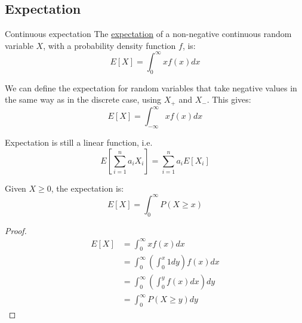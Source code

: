 \documentclass[../Main.tex]{subfiles}
\begin{document}
\subsection{Expectation}
\begin{definition}{Continuous expectation}
    The \underline{expectation} of a non-negative continuous random variable $X$, with a probability density function $f$, is:
    \begin{equation*}
        E[X] = \int_0^\infty xf(x) dx
    \end{equation*}
\end{definition}
\begin{remarks}
    \item We can define the expectation for random variables that take negative values in the same way as in the discrete case, using $X_+$ and $X_-$. This gives:
        \begin{equation*}
            E[X] = \int_{-\infty}^\infty xf(x) dx
        \end{equation*}
    \item Expectation is still a linear function, i.e.
        \begin{equation*}
            E\left[\sum_{i = 1}^n a_i X_i\right] = \sum_{i = 1}^n a_i E[X_i]
        \end{equation*}
\end{remarks}
\begin{lemma}
    Given $X \geq 0$, the expectation is:
    \begin{equation*}
        E[X] = \int_0^\infty P(X \geq x)
    \end{equation*}
\end{lemma}
\begin{proof}
    \begin{align*}
        E[X] &= \int_0^\infty x f(x) dx \\
        &= \int_0^\infty \left(\int_0^x 1 dy\right)f(x) dx \\
        &= \int_0^\infty \left(\int_0^y f(x) dx\right) dy \\ %
        &= \int_0^\infty P(X \geq y) dy
    \end{align*}
\end{proof}
\end{document}
